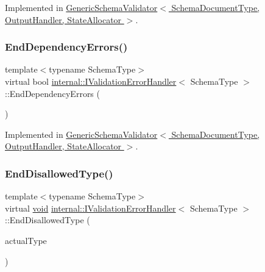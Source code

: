 Implemented in \hyperlink{classGenericSchemaValidator_a82aa865146069e3ba5010d25346a71f2}{Generic\+Schema\+Validator$<$ Schema\+Document\+Type, Output\+Handler, State\+Allocator $>$}.

\mbox{\label{classinternal_1_1IValidationErrorHandler_a817c1e3e9cc62603997a2fcdc564820b}} 
\subsubsection{\texorpdfstring{End\+Dependency\+Errors()}{EndDependencyErrors()}}
{\footnotesize\ttfamily template$<$typename Schema\+Type$>$ \\
virtual bool \hyperlink{classinternal_1_1IValidationErrorHandler}{internal\+::\+I\+Validation\+Error\+Handler}$<$ Schema\+Type $>$\+::End\+Dependency\+Errors (\begin{DoxyParamCaption}{ }\end{DoxyParamCaption})\hspace{0.3cm}{\ttfamily [pure virtual]}}



Implemented in \hyperlink{classGenericSchemaValidator_ab6d1c964faaa0f86f9da51a0f66dc1e4}{Generic\+Schema\+Validator$<$ Schema\+Document\+Type, Output\+Handler, State\+Allocator $>$}.

\mbox{\label{classinternal_1_1IValidationErrorHandler_ad8133b3c055b3a91b5072af81304ab87}} 
\subsubsection{\texorpdfstring{End\+Disallowed\+Type()}{EndDisallowedType()}}
{\footnotesize\ttfamily template$<$typename Schema\+Type$>$ \\
virtual \hyperlink{imgui__impl__opengl3__loader_8h_ac668e7cffd9e2e9cfee428b9b2f34fa7}{void} \hyperlink{classinternal_1_1IValidationErrorHandler}{internal\+::\+I\+Validation\+Error\+Handler}$<$ Schema\+Type $>$\+::End\+Disallowed\+Type (\begin{DoxyParamCaption}\item[{const typename Schema\+Type\+::\+Value\+Type \&}]{actual\+Type }\end{DoxyParamCaption})\hspace{0.3cm}{\ttfamily [pure virtual]}}


